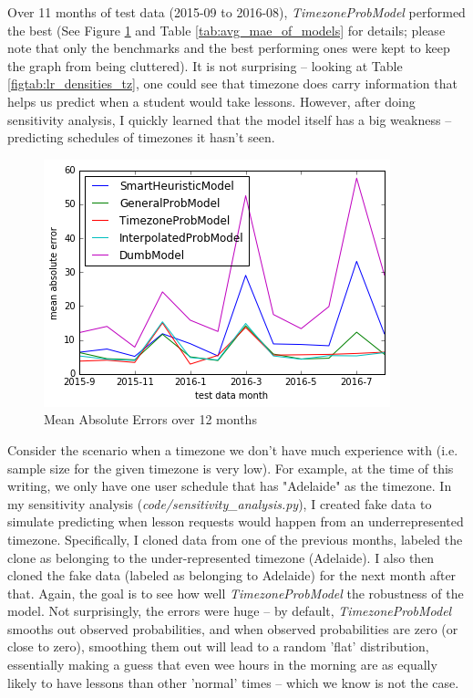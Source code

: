 \documentclass[oneside]{article}
\begin{document}
Over 11 months of test data (2015-09 to 2016-08), \emph{TimezoneProbModel}
performed the best (See Figure \ref{fig:mae_models} and Table
\ref{tab:avg_mae_of_models} for details; please note that only the benchmarks
and the best performing ones were kept to keep the graph from being cluttered).
It is not surprising -- looking at Table \ref{figtab:lr_densities_tz}, one
could see that timezone does carry information that helps us predict when a
student would take lessons. However, after doing sensitivity analysis, I
quickly learned that the model itself has a big weakness -- predicting
schedules of timezones it hasn't seen.

\begin{figure}[h!]
\centering
\includegraphics[scale=0.8]{img/mae_models.png}
\caption{Mean Absolute Errors over 12 months}
\label{fig:mae_models}
\end{figure}

Consider the scenario when a timezone we don't have much experience with (i.e.
sample size for the given timezone is very low). For example, at the time of
this writing, we only have one user schedule that has "Adelaide" as the
timezone. In my sensitivity analysis (\emph{code/sensitivity\_analysis.py}), I
created fake data to simulate predicting when lesson requests would happen from
an underrepresented timezone.  Specifically, I cloned data from one of the
previous months, labeled the clone as belonging to the under-represented
timezone (Adelaide).  I also then cloned the fake data (labeled as belonging to
Adelaide) for the next month after that. Again, the goal is to see how well
\emph{TimezoneProbModel} the robustness of the model. Not surprisingly, the
errors were huge -- by default, \emph{TimezoneProbModel} smooths out observed
probabilities, and when observed probabilities are zero (or close to zero),
smoothing them out will lead to a random 'flat' distribution, essentially
making a guess that even wee hours in the morning are as equally likely to have
lessons than other 'normal' times -- which we know is not the case.
\end{document}
